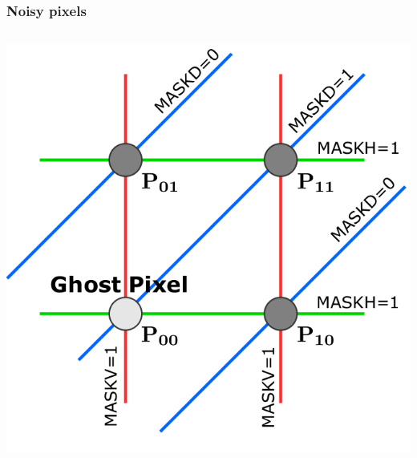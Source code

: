     \begin{frame}
        \frametitle{Noisy pixels}
        \begin{columns}
                \centering
                \includegraphics[width=.8\linewidth]{figures/Monopix1/masking_scheme.png}        
        \end{columns}
    \end{frame}    

